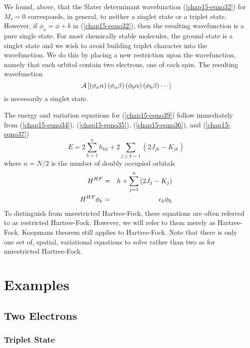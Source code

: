 We found, above, that the Slater determinant wavefunction
(\ref{chap15-eqno32}) for $M_s = 0$ corresponds, in general, to
neither a singlet state or a triplet state.  However, if $\phi_a =
\phi +b$ in (\ref{chap15-eqno32}), then the resulting wavefunction is
a pure single state.  For most chemically stable molecules, the ground
state is a singlet state and we wish to avoid building triplet
character into the wavefunction. We do this by placing a new
restriction upon the wavefunction, namely that each orbital contain
two electrons, one of each spin. The resulting wavefunction
\begin{equation}
{\cal A} \left[ \left( \phi_a \alpha \right) \left( \phi_a \beta 
\right) \left( \phi_b \alpha \right) \left( \phi_b \beta \right) 
\cdots \right]
\label{chap15-eqno39}
\end{equation}
is necessarily a singlet state.

The energy and variation equations for (\ref{chap15-eqno39}) follow
immediately from (\ref{chap15-eqno34}), (\ref{chap15-eqno35}),
(\ref{chap15-eqno36}), and (\ref{chap15-eqno37})
\begin{equation}
E = 2 \sum^{n}_{k=1} h_{kk} + 2 \sum_{j \geq k=1} \left( 2 J_{jk} - 
K_{jk} \right)
\end{equation}
where $n = N/2$ is the number of doubly occupied orbitals
\begin{eqnarray}
H^{HF} &=& h + \sum^{n}_{j=1} \left( 2 J_j - K_j \right)\cr
H^{HF} \phi_k &=& \epsilon_k \phi_k
\end{eqnarray}
To distinguish from unrestricted Hartree-Fock, these equations are often 
referred to as restricted Hartree-Fock.  However, we will refer to them merely
as Hartree-Fock.  Koopmans theorem still applies to Hartree-Fock.  Note that
there is only one set of, spatial, variational equations to solve rather 
than two as for unrestricted Hartree-Fock.

\section{Examples}

\subsection{Two Electrons}

\subsubsection{Triplet State}

